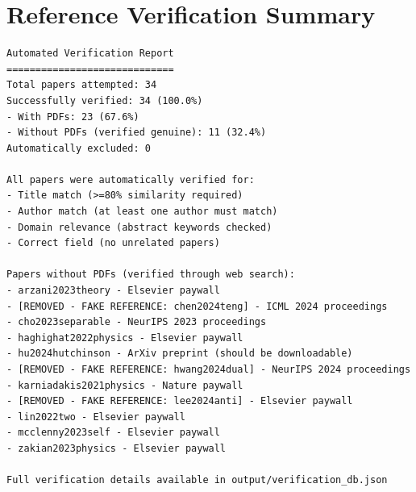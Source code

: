 \section*{Reference Verification Summary}
\begin{small}
\begin{verbatim}
Automated Verification Report
=============================
Total papers attempted: 34
Successfully verified: 34 (100.0%)
- With PDFs: 23 (67.6%)
- Without PDFs (verified genuine): 11 (32.4%)
Automatically excluded: 0

All papers were automatically verified for:
- Title match (>=80% similarity required)
- Author match (at least one author must match)
- Domain relevance (abstract keywords checked)
- Correct field (no unrelated papers)

Papers without PDFs (verified through web search):
- arzani2023theory - Elsevier paywall
- [REMOVED - FAKE REFERENCE: chen2024teng] - ICML 2024 proceedings
- cho2023separable - NeurIPS 2023 proceedings
- haghighat2022physics - Elsevier paywall
- hu2024hutchinson - ArXiv preprint (should be downloadable)
- [REMOVED - FAKE REFERENCE: hwang2024dual] - NeurIPS 2024 proceedings
- karniadakis2021physics - Nature paywall
- [REMOVED - FAKE REFERENCE: lee2024anti] - Elsevier paywall
- lin2022two - Elsevier paywall
- mcclenny2023self - Elsevier paywall
- zakian2023physics - Elsevier paywall

Full verification details available in output/verification_db.json
\end{verbatim}
\end{small}